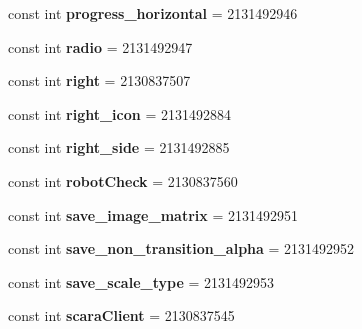 \begin{DoxyCompactItemize}
const int {\bfseries progress\+\_\+horizontal} = 2131492946
\item 
\mbox{\label{classst_delivery_1_1_resource_1_1_id_af1c855ca800e5e831f69bfaad54e47e7}} 
const int {\bfseries radio} = 2131492947
\item 
\mbox{\label{classst_delivery_1_1_resource_1_1_id_aacb10d882bce829dc88f369da89f993f}} 
const int {\bfseries right} = 2130837507
\item 
\mbox{\label{classst_delivery_1_1_resource_1_1_id_ab6eb890997753fa4088ca0e950f3d788}} 
const int {\bfseries right\+\_\+icon} = 2131492884
\item 
\mbox{\label{classst_delivery_1_1_resource_1_1_id_abdeb35cf1fb5703a99f9e4305c14938c}} 
const int {\bfseries right\+\_\+side} = 2131492885
\item 
\mbox{\label{classst_delivery_1_1_resource_1_1_id_ae12002c504cfa239b78be5e2aabc444b}} 
const int {\bfseries robot\+Check} = 2130837560
\item 
\mbox{\label{classst_delivery_1_1_resource_1_1_id_a5bcaf181589e531cfae14f87189cf038}} 
const int {\bfseries save\+\_\+image\+\_\+matrix} = 2131492951
\item 
\mbox{\label{classst_delivery_1_1_resource_1_1_id_a9c855404b6a710e11ca22a8420394522}} 
const int {\bfseries save\+\_\+non\+\_\+transition\+\_\+alpha} = 2131492952
\item 
\mbox{\label{classst_delivery_1_1_resource_1_1_id_af634c07a2c32a22e0d34efc58d912b08}} 
const int {\bfseries save\+\_\+scale\+\_\+type} = 2131492953
\item 
\mbox{\label{classst_delivery_1_1_resource_1_1_id_ac247101c8c12a9a0c1e58af7ec4690ba}} 
const int {\bfseries scara\+Client} = 2130837545
\item 
\mbox{\label{classst_delivery_1_1_resource_1_1_id_ace7989bafe36ea3054305281b31dd1b3}} 

\end{DoxyCompactItemize}
